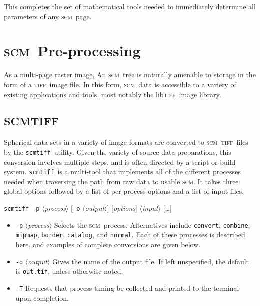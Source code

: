 \documentclass[oneside,10pt]{memoir}
\newcommand{\scm}     {\textsc{scm}}
\newcommand{\tiff}    {\textsc{tiff}}
\newcommand{\libtiff} {lib\textsc{tiff}}
\newcommand{\scmtiff} {\texttt{scmtiff}}
\newcommand{\inangles}[1]{$\langle$#1$\rangle$}
\newenvironment{optionlist}
  {\setlength{\leftmargini}{1in}\begin{itemize}}{\end{itemize}}
\begin{document}
\begin{Spacing}{1.1}
This completes the set of mathematical tools needed to immediately determine all parameters of any \scm\ page.


\chapter{\scm\ Pre-processing}

As a multi-page raster image, An \scm\ tree is naturally amenable to storage in the form of a \tiff\ image file. In this form, \scm\ data is accessible to a variety of existing applications and tools, most notably the \libtiff\ image library.

\section{SCMTIFF}

Spherical data sets in a variety of image formats are converted to \scm\ \tiff\ files by the \scmtiff\ utility. Given the variety of source data preparations, this conversion involves multiple steps, and is often directed by a script or build system. \scmtiff\ is a multi-tool that implements all of the different processes needed when traversing the path from raw data to usable \scm. It takes three global options followed by a list of per-process options and a list of input files.

\bigskip\noindent\scmtiff\ \texttt{-p} \inangles{\textit{process}} [\texttt{-o} \inangles{\textit{output}}] [\textit{options}] \inangles{\textit{input}} [\ldots]

\begin{optionlist}
\item[\texttt{-p} \inangles{\textit{process}}] Selects the \scm\ process. Alternatives include \texttt{convert}, \texttt{combine}, \texttt{mipmap}, \texttt{border}, \texttt{catalog}, and \texttt{normal}. Each of these processes is described here, and examples of complete conversions are given below.

\item[\texttt{-o} \inangles{\textit{output}}] Gives the name of the output file. If left unspecified, the default is \texttt{out.tif}, unless otherwise noted.

\item[\texttt{-T}] Requests that process timing be collected and printed to the terminal upon completion.
\end{optionlist}


\end{Spacing}
\end{document}
